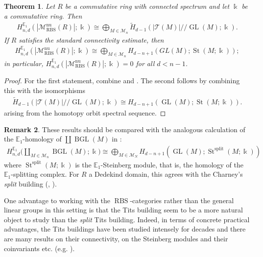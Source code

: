 \documentclass[12pt, reqno]{amsart}
\theoremstyle{plain}
\newtheorem{theorem}{Theorem}[section]
\theoremstyle{definition}
\newtheorem{remark}[theorem]{Remark}
\begin{document}
\begin{theorem}\label{E1-homology for general ring}
Let $R$ be a commutative ring with connected spectrum and let $\Bbbk$ be a commutative ring. Then
\begin{align*}
H_{n,d}^{\mathbb{E}_1}(|\mathscr{M}_{\operatorname{RBS}}^{\operatorname{nu}}(R)|;\Bbbk)\cong \bigoplus_{M\in \mathcal{M}_n} \tilde{H}_{d-1}(|\mathcal{T}(M)|/\!\!/\operatorname{GL}(M);\Bbbk).
\end{align*}
If $R$ satisfies the standard connectivity estimate, then
\begin{align*}
H^{\mathbb{E}_1}_{n,d}(|\mathscr{M}_{\operatorname{RBS}}^{\operatorname{nu}}(R)|;\Bbbk)\cong \bigoplus_{M\in \mathcal{M}_n}H_{d-n+1}(GL(M); \operatorname{St}(M;\Bbbk));
\end{align*}
in particular, $H^{\mathbb{E}_1}_{n,d}(|\mathscr{M}_{\operatorname{RBS}}^{\operatorname{nu}}(R)|;\Bbbk)=0$ 
for all $d< n-1$.
\end{theorem}
\begin{proof}
For the first statement, combine  and . The second follows by combining this with the isomorphisms
\begin{align*}
\tilde{H}_{d-1}(|\mathcal{T}(M)|/\!\!/\operatorname{GL}(M);\Bbbk)\cong H_{d-n+1}(\operatorname{GL}(M);\operatorname{St}(M;\Bbbk)).
\end{align*}
arising from the homotopy orbit spectral sequence.
\end{proof}


\begin{remark}
These results should be compared with the analogous calculation of the $\mathbb{E}_1$-homology of $\coprod \operatorname{BGL}(M)$ in \cite[\S 17.2]{GalatiusKupersRandalWilliams}:
\begin{align*}
H^{\mathbb{E}_1}_{n,d}\bigg(\coprod_{M\in \mathcal{M}_n} \operatorname{BGL}(M);\Bbbk\bigg)\cong \bigoplus_{M\in \mathcal{M}_N}H_{d-n+1}(\operatorname{GL}(M); \operatorname{St}^{\operatorname{split}}(M;\Bbbk))
\end{align*}
where $\operatorname{St}^{\operatorname{split}}(M;\Bbbk)$ is the $\mathbb{E}_1$-Steinberg module, that is, the homology of the $\mathbb{E}_1$-splitting complex. For $R$ a Dedekind domain, this agrees with the Charney's \textit{split} building (\cite{Charney80}, \cite[\S 18.2]{GalatiusKupersRandalWilliams}).

One advantage to working with the $\operatorname{RBS}$-categories rather than the general linear groups in this setting is that the Tits building seem to be a more natural object to study than the \textit{split} Tits building. Indeed, in terms of concrete practical advantages, the Tits buildings have been studied intensely for decades and there are many results on their connectivity, on the Steinberg modules and their coinvariants etc. (e.g. \cite{LeeSzczarba,AshRudolph,ChurchFarbPutman}).
\end{remark}
\end{document}
